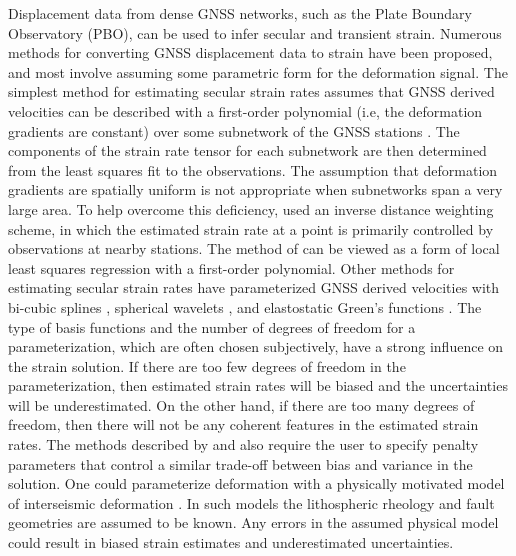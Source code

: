 \documentclass[extra,mreferee]{gji}
\begin{document}
Displacement data from dense GNSS networks, such as the Plate Boundary
Observatory (PBO), can be used to infer secular and transient strain.
Numerous methods for converting GNSS displacement data to strain have
been proposed, and most involve assuming some parametric form for the
deformation signal. The simplest method for estimating secular strain
rates assumes that GNSS derived velocities can be described with a
first-order polynomial (i.e, the deformation gradients are constant)
over some subnetwork of the GNSS stations \citep[e.g.,][]{Feigl1990,
Murray2000}. The components of the strain rate tensor for each
subnetwork are then determined from the least squares fit to the
observations. The assumption that deformation gradients are spatially
uniform is not appropriate when subnetworks span a very large area. To
help overcome this deficiency, \citet{Shen1996,Shen2015} used an
inverse distance weighting scheme, in which the estimated strain rate
at a point is primarily controlled by observations at nearby stations.
The method of \citet{Shen1996,Shen2015} can be viewed as a form of
local least squares regression with a first-order polynomial. Other
methods for estimating secular strain rates have parameterized GNSS
derived velocities with bi-cubic splines \citep{Beavan2001}, spherical
wavelets \citep{Tape2009}, and elastostatic Green's functions
\citep{Sandwell2016}. The type of basis functions and the number of
degrees of freedom for a parameterization, which are often chosen
subjectively, have a strong influence on the strain solution. If there
are too few degrees of freedom in the parameterization, then estimated
strain rates will be biased and the uncertainties will be
underestimated. On the other hand, if there are too many degrees of
freedom, then there will not be any coherent features in the estimated
strain rates. The methods described by \citet{Beavan2001} and
\citet{Tape2009} also require the user to specify penalty parameters
that control a similar trade-off between bias and variance in the
solution. One could parameterize deformation with a physically
motivated model of interseismic deformation \citep[e.g.,][]{Meade2005,
McCaffrey2007}. In such models the lithospheric rheology and fault
geometries are assumed to be known. Any errors in the assumed physical
model could result in biased strain estimates and underestimated
uncertainties.

\end{document}
